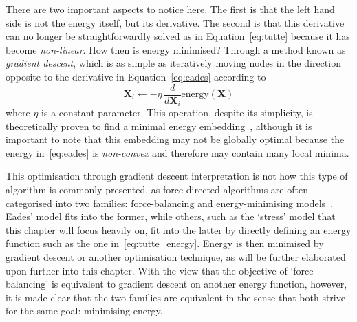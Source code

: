 There are two important aspects to notice here. The first is that the left hand side is not the energy itself, but its derivative. The second is that this derivative can no longer be straightforwardly solved as in Equation~\eqref{eq:tutte} because it has become \emph{non-linear}. How then is energy minimised? Through a method known as \emph{gradient descent}, which is as simple as iteratively moving nodes in the direction opposite to the derivative in Equation~\eqref{eq:eades} according to
\begin{equation}
    \mathbf{X}_i \leftarrow -\eta\, \frac{d}{d\mathbf{X}_i}\mathrm{energy}(\mathbf{X})
\end{equation}
where $\eta$ is a constant parameter.
This operation, despite its simplicity, is theoretically proven to find a minimal energy embedding~\cite{gradientdescent}, although it is important to note that this embedding may not be globally optimal because the energy in~\eqref{eq:eades} is \emph{non-convex} and therefore may contain many local minima.

This optimisation through gradient descent interpretation is not how this type of algorithm is commonly presented, as  force-directed algorithms are often categorised into two families: force-balancing and energy-minimising models~\cite{ortmann, brandes_physical}.
Eades' model fits into the former, while others, such as the `stress' model that this chapter will focus heavily on, fit into the latter by directly defining an energy function such as the one in~\eqref{eq:tutte_energy}. Energy is then minimised by gradient descent or another optimisation technique, as will be further elaborated upon further into this chapter.
With the view that the objective of `force-balancing' is equivalent to gradient descent on another energy function, however, it is made clear that the two families are equivalent in the sense that both strive for the same goal: minimising energy.

